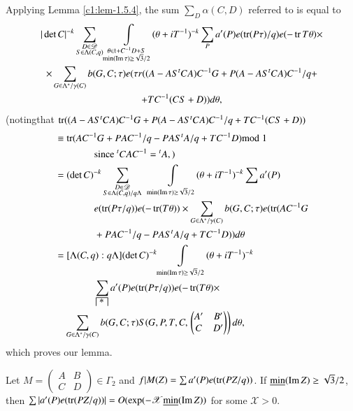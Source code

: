 Applying Lemma \ref{c1:lem-1.5.4}, the sum $\sum\limits_{D}\alpha(C,D)$
referred to is equal to 
{\fontsize{10}{12}\selectfont
\begin{gather*}
|\det
C|^{-k}\sum_{\substack{D\in\mathscr{D}\\ S\in\Lambda(C,q)}}
\int\limits_{\substack{\theta\in\mathfrak{t}+C^{-1}D+S\\ \min
(\operatorname{Im}\tau)\geq\sqrt{3}/2}}(\theta+iT^{-1})^{-k}\sum_{P}a'(P)
e(\operatorname{tr}(P\tau)/q)e(-\operatorname{tr} T\theta)\times\\
\times \sum_{G\in\Lambda^{\ast}/\gamma(C)}b(G,C;\tau)e(\tau
r((A-AS{}^{t}CA)C^{-1}G+P(A-AS^{t}CA)C^{-1}/q+\\
+TC^{-1}(CS+D))d\theta,
\end{gather*}}\relax
(noting\pageoriginale that
$\operatorname{tr}((A-AS{}^{t}CA)C^{-1}G+P(A-AS{}^{t}CA)C^{-1}/q+TC^{-1}(CS+D))$
\begin{align*}
&\equiv \tr(AC^{-1}G+PAC^{-1}/q-PAS{}^{t}A/q+TC^{-1}D)\rm{mod} \; 1\\ 
&\qquad\qquad\text{since } {}^{t}CAC^{-1}={}^{t}A,)\\
&= (\det
  C)^{-k}\sum_{\substack{D\in\mathscr{D}\\ S\in\Lambda(C,q)/q\Lambda}}
  \;\; 
  \int\limits_{\min (\Iim\tau)\geq \sqrt{3}/2}(\theta+iT^{-1})^{-k}\sum
  a'(P)\\
&\qquad\qquad e(\tr(P\tau/q))e(-\tr(T\theta))
\times\sum_{G\in\Lambda^{\ast}/\gamma(C)}b(G,C;\tau)e(\tr(AC^{-1}G\\
&\qquad\qquad +PAC^{-1}/q-PAS{}^{t}A/q+TC^{-1}D))d\theta\\
&= [\Lambda(C,q):q\Lambda](\det C)^{-k}\int\limits_{\min (\Iim
    \tau)\geq\sqrt{3}/2}(\theta+iT^{-1})^{-k}\\
&\qquad\qquad\sum_{\house{\ast}}a'(P)e(\tr(P\tau
  /q))e(-\tr(T\theta)\times\\
&\quad \sum_{G\in\Lambda^{\ast}/\gamma(C)}b(G,C;\tau)S(G,P,T,C,
\left.
\begin{pmatrix} 
A' & B'\\
C & D'\\
\end{pmatrix}
\right)d\theta,
\end{align*}
which proves our lemma.

\begin{sublemma}\label{c1:lem-1.5.9}
Let $M=\left(\begin{smallmatrix} A & B\\ C & D
\end{smallmatrix}\right)\in\Gamma_{2}$ and $f|M(Z)=\sum
a'(P)e(\operatorname{tr}(PZ/q))$. If $\underline{\min}(\operatorname{Im} Z)\geq \sqrt{3}/2$, then $\sum
|a'(P)e(\tr(PZ/q))|=O(\exp(-\mathscr{X}\break\ub{\min} (\Iim Z))$ for some
$\mathscr{X}>0$. 
\end{sublemma}

